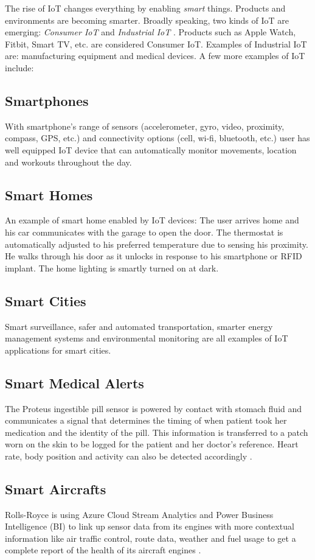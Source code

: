 \documentclass[sigconf]{acmart}
\begin{document}
	The rise of IoT changes everything by enabling {\em smart} things. Products and environments are becoming smarter. Broadly speaking, two kinds of IoT are emerging: {\em Consumer IoT} and {\em Industrial IoT} \cite{iot}. Products such as Apple Watch, Fitbit, Smart TV, etc. are considered Consumer IoT. Examples of Industrial IoT are: manufacturing equipment and medical devices. A few more examples of IoT include:
	
	\subsection{Smartphones}
	With smartphone's range of sensors (accelerometer, gyro, video, proximity, compass, GPS, etc.) and connectivity options (cell, wi-fi, bluetooth, etc.) user has well equipped IoT device that can automatically monitor movements, location and workouts throughout the day.
	
	\subsection{Smart Homes}
	An example of smart home enabled by IoT devices: The user arrives home and his car communicates with the garage to open the door. The thermostat is automatically adjusted to his preferred temperature due to sensing his proximity. He walks through his door as it unlocks in response to his smartphone or RFID implant. The home lighting is smartly turned on at dark.
	
	\subsection{Smart Cities}
	Smart surveillance, safer and automated transportation, smarter energy management systems and environmental monitoring are all examples of IoT applications for smart cities.
	
	\subsection{Smart Medical Alerts}
	The Proteus ingestible pill sensor is powered by contact with stomach fluid and communicates a signal that determines the timing of when patient took her medication and the identity of the pill. This information is transferred to a patch worn on the skin to be logged for the patient and her doctor's reference. Heart rate, body position and activity can also be detected accordingly \cite{proteus}.
	
	\subsection{Smart Aircrafts}
	Rolls-Royce is using Azure Cloud Stream Analytics and Power Business Intelligence (BI) to link up sensor data from its engines with more contextual information like air traffic control, route data, weather and fuel usage to get a complete report of the health of its aircraft engines \cite{smart-aircraft}.
	
\end{document}
